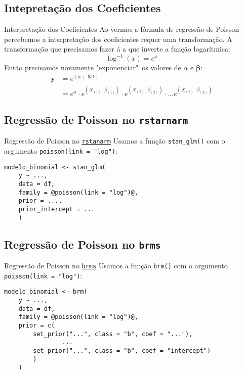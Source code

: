 \subsection{Intepretação dos Coeficientes}
\begin{frame}{Interpretação dos Coeficientes}
    Ao vermos a fórmula de regressão de Poisson percebemos a interpretação dos
    coeficientes requer uma transformação. A transformação que precisamos fazer á a
    que inverte a função logarítmica:
    $$
    \log^{-1}(x) = e^x
    $$
    Então precisamos novamente "exponenciar"~os valores de $\alpha$ e
    $\boldsymbol{\beta}$:
    $$
    \begin{aligned}
        \boldsymbol{y} &= e^{(\alpha +  \mathbf{X} \boldsymbol{\beta})} \\
        &= e^{\alpha} \cdot e^{ \left( X_{(1)} \cdot \beta_{(1)} \right) } \cdot e^{ \left( X_{(2)} \cdot \beta_{(2)} \right) } \cdot \dots e^{ \left( X_{(k)} \cdot \beta_{(k)} \right) }
    \end{aligned}
    $$
\end{frame}

\subsection{Regressão de Poisson no \texttt{rstarnarm}}
\begin{frame}[fragile]{Regressão de Poisson no \href{http://mc-stan.org/rstanarm/}{\texttt{rstanarm}}}
    Usamos a função \texttt{stan\_glm()} com o argumento \texttt{poisson(link = "log")}:
    \vfill
    \begin{lstlisting}[basicstyle=\small]
    modelo_binomial <- stan_glm(
    y ~ ...,
    data = df,
    family = @poisson(link = "log")@,
    prior = ...,
    prior_intercept = ...
    )
    \end{lstlisting}
\end{frame}

\subsection{Regressão de Poisson no \texttt{brms}}
\begin{frame}[fragile]{Regressão de Poisson no \href{https://paul-buerkner.github.io/brms/}{\texttt{brms}}}
    Usamos a função \texttt{brm()} com o argumento \texttt{poisson(link = "log")}:
    \vfill
    \begin{lstlisting}[basicstyle=\small]
    modelo_binomial <- brm(
    y ~ ...,
    data = df,
    family = @poisson(link = "log")@,
    prior = c(
        set_prior("...", class = "b", coef = "..."),
                ...
        set_prior("...", class = "b", coef = "intercept")
        )
    )
    \end{lstlisting}
\end{frame}
